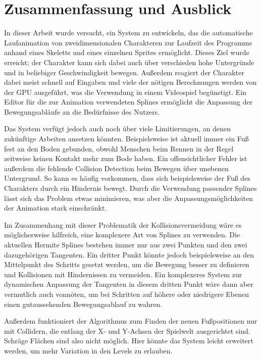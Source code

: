 \chapter{Zusammenfassung und Ausblick} \label{zusammenfassung}
In dieser Arbeit wurde versucht, ein System zu entwickeln, das die automatische Laufanimation von zweidimensionalen Charakteren zur Laufzeit des Programms anhand eines Skeletts und eines einzelnen Sprites ermöglicht. Dieses Ziel wurde erreicht; der Charakter kann sich dabei auch über verschieden hohe Untergründe und in beliebiger Geschwindigkeit bewegen. Außerdem reagiert der Charakter dabei meist schnell auf Eingaben und viele der nötigen Berechnungen werden von der GPU ausgeführt, was die Verwendung in einem Videospiel begünstigt. Ein Editor für die zur Animation verwendeten Splines ermöglicht die Anpassung der Bewegungsabläufe an die Bedürfnisse des Nutzers.

Das System verfügt jedoch auch noch über viele Limitierungen, an denen zukünftige Arbeiten ansetzen könnten. Beispielsweise ist aktuell immer ein Fuß fest an den Boden gebunden, obwohl Menschen beim Rennen in der Regel zeitweise keinen Kontakt mehr zum Bode haben. Ein offensichtlicher Fehler ist außerdem die fehlende Collision Detection beim Bewegen über unebenen Untergrund. So kann es häufig vorkommen, dass sich beispielsweise der Fuß des Charakters durch ein Hindernis bewegt. Durch die Verwendung passender Splines lässt sich das Problem etwas minimieren, was aber die Anpassungsmöglichkeiten der Animation stark einschränkt.

Im Zusammenhang mit dieser Problematik der Kollisionsvermeidung wäre es möglicherweise hilfreich, eine komplexere Art von Splines zu verwenden. Die aktuellen Hermite Splines bestehen immer nur aus zwei Punkten und den zwei dazugehörigen Tangenten. Ein dritter Punkt könnte jedoch beispielsweise an den Mittelpunkt des Schritts gesetzt werden, um die Bewegung besser zu definieren und Kollisionen mit Hindernissen zu vermeiden. Ein komplexeres System zur dynamischen Anpassung der Tangenten in diesem dritten Punkt wäre dann aber vermutlich auch vonnöten, um bei Schritten auf höhere oder niedrigere Ebenen einen gutaussehenden Bewegungsablauf zu wahren.

Außerdem funktioniert der Algorithmus zum Finden der neuen Fußpositionen nur mit Collidern, die entlang der X- und Y-Achsen der Spielwelt ausgerichtet sind. Schräge Flächen sind also nicht möglich. Hier könnte das System leicht erweitert werden, um mehr Variation in den Levels zu erlauben.




